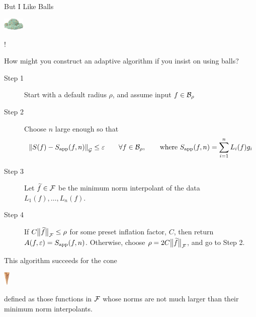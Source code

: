 \documentclass[11pt,compress,xcolor={usenames,dvipsnames},aspectratio=169]{beamer}
\newcommand{\Sapp}{S_{\textup{app}}}
\newcommand{\scoop}[1]{\parbox{#1}{\includegraphics[width=#1]{IceCreamScoop.eps}}\xspace}
\newcommand{\smallscoop}{\scoop{1cm}}
\newcommand{\smallcone}{\parbox{0.65cm}{\includegraphics[width=0.3cm,angle=270]{MediumWaffleCone.eps}}\xspace}
\begin{document}
\begin{frame}[label = BallsWontHelp]{But I Like Balls \smallscoop!}

\vspace{-5ex}
How might you construct an adaptive algorithm if you insist on using \alert{balls}?

\vspace{-2ex}
\begin{description}
    \item[Step 1] Start with a default radius $\rho$, and assume input $f \in \cb_{\rho}$
    
    \item[Step 2] Choose $n$ large enough so that 
    \[
    \norm[\cg]{S(f) - \Sapp(f,n)} \le \varepsilon \qquad \forall f \in \cb_{\rho}, \qquad \text{where } \Sapp(f,n) = \sum_{i=1}^n L_i(f) g_i
    \]
    
    \item[Step 3] Let $\tf \in \cf$ be the \alert{minimum} norm interpolant of the data $L_1(f), \ldots, L_n(f)$.  
    
    \item[Step 4]  If $C\bignorm[\cf]{\tf} \le \rho$ for some preset inflation factor, $C$, then return $A(f,\varepsilon) = \Sapp(f,n)$.  Otherwise, choose $\rho = 2C\bignorm[\cf]{\tf}$, and go to Step 2.
\end{description}

\vspace{-2ex}

This algorithm succeeds for the \alert{cone} \smallcone defined as those functions in $\cf$ whose norms are not much larger than their minimum norm interpolants.   \hyperlink{ConeFrame}{}
    
\end{frame}
\end{document}
